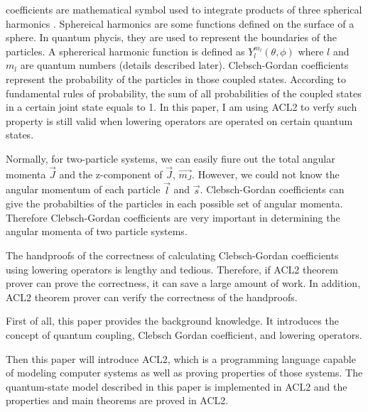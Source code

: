 \documentclass[12pt,journal,compsoc]{IEEEtran}
\begin{document}
% 
% 
% 
% 
 coefficients are mathematical symbol used to integrate products of three spherical harmonics \cite{clebsch}. 
Sphereical harmonics are some functions defined on the surface of a sphere. In quantum phycis, they are used to represent the boundaries of the particles. A sphererical harmonic function is defined as $Y_{l}^{m_l}(\theta,\phi)$ where $l$ and $m_l$ are quantum numbers (details described later).
Clebsch-Gordan coefficients represent the probability of the particles in those coupled states. According to fundamental rules of probability, the sum of all probabilities of the coupled states in a certain joint state equals to 1. In this paper, I am using ACL2 to verfy such property is still valid when lowering operators are operated on certain quantum states. 

Normally, for two-particle systems, we can easily fiure out the total angular momenta $\vec{J}$ and the z-component of $\vec{J}$, $\vec{m_{J}}$. However, we could not know the angular momentum of each particle $\vec{l}$ and $\vec{s}$. Clebsch-Gordan coefficients can give the probabilties of the particles in each possible set of angular momenta. Therefore Clebsch-Gordan coefficients are very important in determining the angular momenta of two particle systems.

The handproofs of the correctness of calculating Clebsch-Gordan coefficients using lowering operators is lengthy and tedious. Therefore, if ACL2 theorem prover can prove the correctness, it can save a large amount of work. In addition, ACL2 theorem prover can verify the correctness of the handproofs.

First of all, this paper provides the background knowledge. It introduces the concept of quantum coupling, Clebsch Gordan coefficient, and lowering operators.

Then this paper will introduce ACL2, which is a programming language capable of modeling computer systems as well as proving properties of those systems. The quantum-state model described in this paper is implemented in ACL2 and the properties and main theorems are proved in ACL2.
\end{document}
